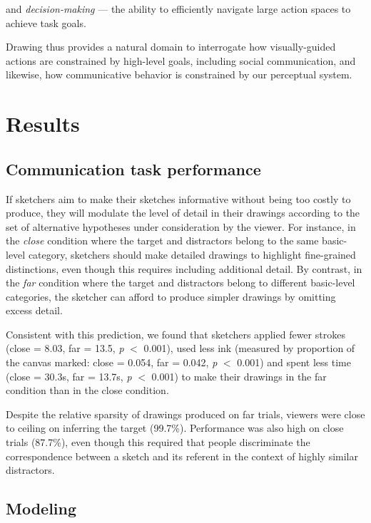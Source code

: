 \documentclass[9pt,twocolumn,twoside]{pnas-new}
\begin{document}
and \textit{decision-making} --- the ability to efficiently navigate large action spaces to achieve task goals.

Drawing thus provides a natural domain to interrogate how visually-guided actions are constrained by high-level goals, including social communication, and likewise, how communicative behavior is constrained by our perceptual system.



\section*{Results}

\subsection*{Communication task performance}

If sketchers aim to make their sketches informative without being too costly to produce, they will modulate the level of detail in their drawings according to the set of alternative hypotheses under consideration by the viewer. For instance, in the \textit{close} condition where the target and distractors belong to the same basic-level category, sketchers should make detailed drawings to highlight fine-grained distinctions, even though this requires including additional detail. By contrast, in the \textit{far} condition where the target and distractors belong to different basic-level categories, the sketcher can afford to produce simpler drawings by omitting excess detail.

Consistent with this prediction, we found that sketchers applied fewer strokes (close = 8.03, far = 13.5, \textit{p} $<$ 0.001), used less ink (measured by proportion of the canvas marked: close = 0.054, far = 0.042, \textit{p} $<$ 0.001) and spent less time (close = 30.3s, far = 13.7s, \textit{p} $<$ 0.001) to make their drawings in the far condition than in the close condition.

Despite the relative sparsity of drawings produced on far trials, viewers were close to ceiling on inferring the target (99.7\%). Performance was also high on close trials (87.7\%), even though this required that people discriminate the correspondence between a sketch and its referent in the context of highly similar distractors.




\subsection*{Modeling}
\end{document}
